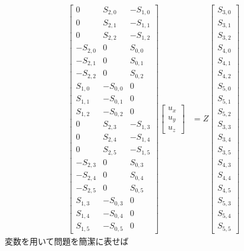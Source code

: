 \documentclass[a4j]{jsarticle}
\begin{document}
\begin{align}
\begin{bmatrix}
0&S_{2,0}&-S_{1,0}\\
0&S_{2,1}&-S_{1,1}\\
0&S_{2,2}&-S_{1,2}\\
-S_{2,0}&0&S_{0,0}\\
-S_{2,1}&0&S_{0,1}\\
-S_{2,2}&0&S_{0,2}\\
S_{1,0}&-S_{0,0}&0\\
S_{1,1}&-S_{0,1}&0\\
S_{1,2}&-S_{0,2}&0\\
%
0&S_{2,3}&-S_{1,3}\\
0&S_{2,4}&-S_{1,4}\\
0&S_{2,5}&-S_{1,5}\\
%
-S_{2,3}&0&S_{0,3}\\
-S_{2,4}&0&S_{0,4}\\
-S_{2,5}&0&S_{0,5}\\
%
S_{1,3}&-S_{0,3}&0\\
S_{1,4}&-S_{0,4}&0\\
S_{1,5}&-S_{0,5}&0
\end{bmatrix}
\begin{bmatrix}
u_x\\
u_y\\
u_z
\end{bmatrix}
&=Z
\begin{bmatrix}
S_{3,0}\\
S_{3,1}\\
S_{3,2}\\
S_{4,0}\\
S_{4,1}\\
S_{4,2}\\
S_{5,0}\\
S_{5,1}\\
S_{5,2}\\
%
S_{3,3}\\
S_{3,4}\\
S_{3,5}\\
%
S_{4,3}\\
S_{4,4}\\
S_{4,5}\\
%
S_{5,3}\\
S_{5,4}\\
S_{5,5}
\end{bmatrix}
\end{align}
変数を用いて問題を簡潔に表せば
\end{document}

